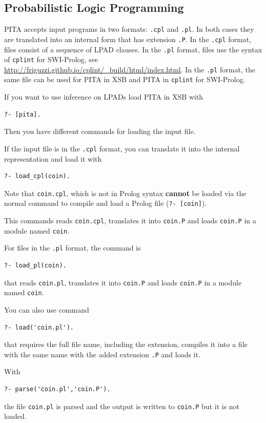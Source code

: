 \subsection{Probabilistic Logic Programming}
PITA accepts input programs in two formats: \texttt{.cpl} and \texttt{.pl}.
In both cases they are translated into an internal form that has extension \texttt{.P}.
In the \texttt{.cpl} format, files consist of a sequence of LPAD clauses.
In the \texttt{.pl} format, files use the syntax of \texttt{cplint} for SWI-Prolog, see
\url{http://friguzzi.github.io/cplint/_build/html/index.html}. In the  \texttt{.pl}
format, the same file can be used for PITA in XSB and PITA in \texttt{cplint} for SWI-Prolog.

If you want to use inference on LPADs load PITA in XSB with
\begin{verbatim}
?- [pita].
\end{verbatim}

Then you have different commands for loading the input file.

If the input file is in the \texttt{.cpl} format, you can translate it into the internal
representation and load it with
\begin{verbatim}
?- load_cpl(coin).
\end{verbatim}
Note that {\tt coin.cpl}, which is not in Prolog syntax {\bf cannot}
be loaded via the normal command to compile and load a Prolog file
({\tt ?- [coin]}).

This commands reads  {\tt coin.cpl}, translates it into  {\tt coin.P}
and loads   {\tt coin.P} in a module named \verb|coin|.

For files in the  \texttt{.pl} format, the command is
\begin{verbatim}
?- load_pl(coin).
\end{verbatim}
that  reads  {\tt coin.pl}, translates it into  {\tt coin.P}
and loads   {\tt coin.P} in a module named \verb|coin|.

You can also use command
\begin{verbatim}
?- load('coin.pl').
\end{verbatim}
that requires the full file name, including the extension, compiles it into a file with the same name with the added extension
\texttt{.P} and loads it.

With
\begin{verbatim}
?- parse('coin.pl','coin.P').
\end{verbatim}
the file \texttt{coin.pl} is parsed and the output is written to \texttt{coin.P} but it is not loaded.

